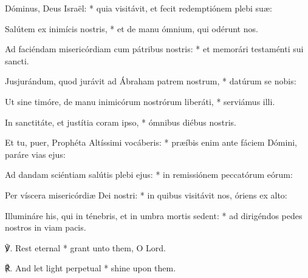 { {} Dóminus, Deus Isra{\"e}l: * quia visitávit, et fecit redemptiónem plebi su{\ae}:\par
{}
Salútem ex inimícis nostris, * et de manu ómnium, qui odérunt nos.\par
Ad faciéndam misericórdiam cum pátribus nostris: * et memorári testaménti sui sancti.\par
Jusjurándum, quod jurávit ad Ábraham patrem nostrum, * datúrum se nobis:\par
Ut sine timóre, de manu inimicórum nostrórum liberáti, * serviámus illi.\par
In sanctitáte, et justítia coram ipso, * ómnibus diébus nostris.\par
Et tu, puer, Prophéta Altíssimi vocáberis: * pr{\ae}íbis enim ante fáciem Dómini, paráre vias ejus:\par
Ad dandam sciéntiam salútis plebi ejus: * in remissiónem peccatórum eórum:\par
Per víscera misericórdi{\ae} Dei nostri: * in quibus visitávit nos, óriens ex alto:\par
Illumináre his, qui in ténebris, et in umbra mortis sedent: * ad dirigéndos pedes nostros in viam pacis.}\par
℣. Rest eternal * grant unto them, O Lord.\par
℟. And let light perpetual * shine upon them.



